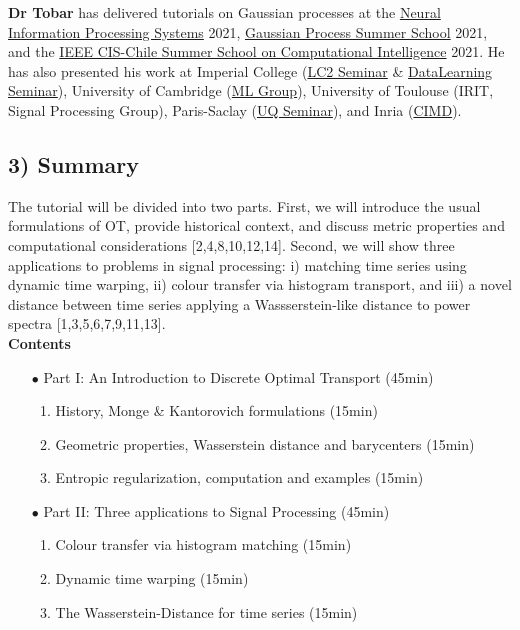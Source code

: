 \documentclass{article}
\begin{document}
\noindent\textbf{Dr Tobar} has delivered tutorials on Gaussian processes at the \href{https://neurips.cc/virtual/2021/tutorial/21890}{Neural Information Processing Systems} 2021, \href{https://www.youtube.com/watch?v=5mBdCGJDbg8&ab_channel=GaussianProcessSummerSchool}{Gaussian Process Summer School} 2021, and the \href{https://www.youtube.com/watch?v=_KTGSIlMXwY}{IEEE CIS-Chile Summer School on Computational Intelligence} 2021. He has also presented his work at Imperial College (\href{https://www.imperial.ac.uk/events/160503/lc2-seminar-felipe-tobar-universidad-de-chile-tba/}{LC2 Seminar} \& \href{https://sites.google.com/view/rossella-arcucci/home/calendar-datalearning}{DataLearning Seminar}), University of Cambridge (\href{https://talks.cam.ac.uk/talk/index/193046}{ML Group}), University of Toulouse (IRIT, Signal Processing Group), Paris-Saclay (\href{https://www.uqsay.org/2023/01/uqsay-53.html}{UQ Seminar}), and Inria (\href{https://misscausal.gitlabpages.inria.fr/misscausal.gitlab.io/events.html}{CIMD}).




\subsection*{3) Summary}
The tutorial will be divided into two parts. First, we will introduce the usual formulations of OT, provide historical context, and discuss metric properties and computational considerations [2,4,8,10,12,14]. Second, we will show three applications to problems in signal processing: i) matching time series using dynamic time warping, ii) colour transfer via histogram transport, and iii) a novel distance between time series applying a Wassserstein-like distance to power spectra [1,3,5,6,7,9,11,13]. \\

\medskip
\noindent\textbf{Contents}
\begin{enumerate}
  \item[$\bullet$] Part I: An Introduction to Discrete Optimal Transport (45min)
  \begin{enumerate}
    \item History, Monge \& Kantorovich formulations (15min)
    \item Geometric properties, Wasserstein distance and barycenters (15min)
    \item Entropic regularization, computation and examples (15min)
  \end{enumerate}
  \item[$\bullet$] Part II: Three applications to Signal Processing  (45min)
  \begin{enumerate}
    \item Colour transfer via histogram matching (15min)
    \item Dynamic time warping (15min)
    \item The Wasserstein-Distance for time series (15min)
  \end{enumerate}
\end{enumerate}
\end{document}

